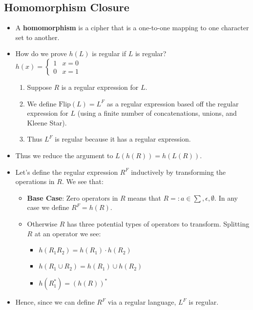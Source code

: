 \subsection{Homomorphism Closure}
\begin{itemize}
    \item A \textbf{homomorphism} is a cipher that is a one-to-one mapping to one character set to another.
    \item How do we prove $h(L)$ is regular if $L$ is regular? \\
    $
    h(x) = \begin{cases}
        1 & x = 0 \\
        0 & x = 1
    \end{cases}
    $
    \begin{enumerate}
        \item Suppose $R$ is a regular expression for $L$.
        \item We define $\text{Flip}(L) = L^F$ as a regular expression based off the regular expression for $L$ (using a finite number of concatenations, unions, and Kleene Star).
        \item Thus $L^F$ is regular because it has a regular expression.
    \end{enumerate}
    \item Thus we reduce the argument to $L(h(R)) = h(L(R))$.
    \item Let's define the regular expression $R^F$ inductively by transforming the operations in $R$. We see that:
    \begin{itemize}
        \item \textbf{Base Case}: Zero operators in $R$ means that $R =: a \in \sum, \epsilon, \emptyset$. In any case we define $R^F = h(R)$.
        \item Otherwise $R$ has three potential types of operators to transform. Splitting $R$ at an operator we see:
        \begin{itemize}
            \item $h(R_1 R_2) = h(R_1) \cdot h(R_2)$
            \item $h(R_1 \cup R_2) = h(R_1) \cup h(R_2)$
            \item $h(R_1^{\ast}) = (h(R))^{\ast}$
        \end{itemize}
    \end{itemize}
    \item Hence, since we can define $R^F$ via a regular language, $L^F$ is regular.
\end{itemize}

